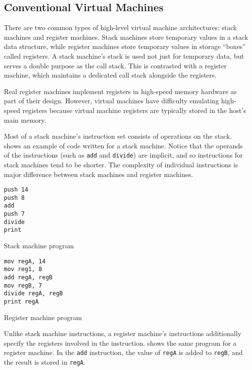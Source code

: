 		\subsection{Conventional Virtual Machines}
			There are two common types of high-level virtual machine architectures: stack machines and register machines. Stack machines store temporary values in a stack data structure, while register machines store temporary values in storage ``boxes'' called registers. A stack machine's stack is used not just for temporary data, but serves a double purpose as the call stack. This is contrasted with a register machine, which maintains a dedicated call stack alongside the registers.
			
			Real register machines implement registers in high-speed memory hardware as part of their design. However, virtual machines have difficulty emulating high-speed registers because virtual machine registers are typically stored in the host's main memory.
			
			Most of a stack machine's instruction set consists of operations on the stack.   shows an example of code written for a stack machine. Notice that the operands of the instructions (such as \texttt{add} and \texttt{divide}) are implicit, and so instructions for stack machines tend to be shorter. The complexity of individual instructions is major difference between stack machines and register machines. 
		
			\begin{doublefig}
				\begin{halffig}
					\begin{lstlisting}
push 14
push 8
add
push 7
divide
print
					\end{lstlisting}
					\caption{Stack machine program}
					\label{fig:stackprogram}
				\end{halffig}
				\begin{halffig}
					\begin{lstlisting}
mov regA, 14
mov reg1, 8
add regA, regB
mov regB, 7
divide regA, regB
print regA
					\end{lstlisting}
					\caption{Register machine program}
					\label{fig:registerprogram}
				\end{halffig}
			\end{doublefig}
			
			Unlike stack machine instructions, a register machine's instructions additionally specify the registers involved in the instruction.  shows the same program for a register machine. In the \texttt{add} instruction, the value of \texttt{regA} is added to \texttt{regB}, and the result is stored in \texttt{regA}.
		
